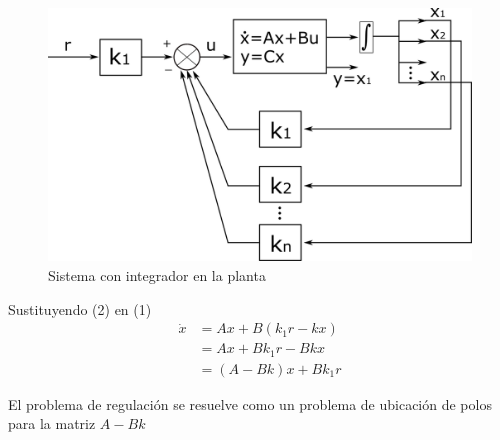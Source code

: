 \begin{figure}[h!]
    \centering
        \includegraphics[scale=0.19]{Control de Sistemas Mecatronicos Figuras/17 Con integrador en la Planta.png}
        \caption{Sistema con integrador en la planta}
\end{figure}

Sustituyendo (2) en (1)
\[
    \begin{split}
        \dot{x} & = Ax + B(k_{1}r - kx) \\
        & = Ax + Bk_{1}r - Bkx \\
        & = (A-Bk)x + Bk_{1}r
    \end{split}
\]

El problema de regulación se resuelve como un problema de ubicación de polos para la matriz \( A-Bk \)